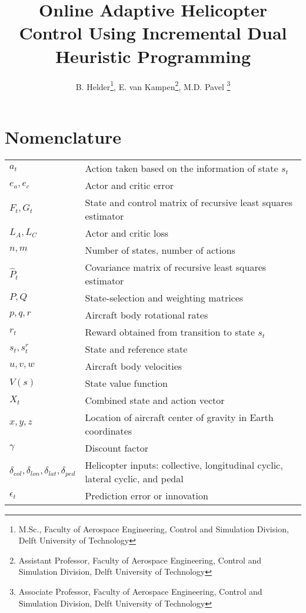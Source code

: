 \documentclass[conf]{new-aiaa} %
\title{Online Adaptive Helicopter Control Using Incremental Dual Heuristic Programming}
\author{B. Helder\footnote{M.Sc., Faculty of Aerospace Engineering, Control and Simulation Division,  Delft University of Technology},
        E. van Kampen\footnote{Assistant Professor, Faculty of Aerospace Engineering, Control and Simulation Division, Delft University of Technology}, 
        M.D. Pavel \footnote{Associate Professor, Faculty of Aerospace Engineering, Control and Simulation Division, Delft University of Technology}}
\affil{Delft University of Technology, P.O Box 5058, 2600GB Delft, The Netherlands}
\begin{document}
\maketitle

\begin{abstract}

\end{abstract}

\section*{Nomenclature}


{\renewcommand\arraystretch{1.0}
\noindent\begin{longtable*}{@{}l @{\quad=\quad} l@{}}
$a_t$               & Action taken based on the information of state $s_t$ \\
$e_a, e_c$          & Actor and critic error \\
$F_t, G_t$          & State and control matrix of recursive least squares estimator \\
$L_A, L_C$          & Actor and critic loss \\ 
$n, m$              & Number of states, number of actions\\
$\hat{P}_t$         & Covariance matrix of recursive least squares estimator \\
$P, Q$              & State-selection and weighting matrices \\
$p, q, r$           & Aircraft body rotational rates \\
$r_{t}$             & Reward obtained from transition to state $s_t$ \\
$s_t, s^r_t$        & State and reference state \\
$u, v, w$           & Aircraft body velocities \\
$V(s) $             & State value function \\
$X_t$               & Combined state and action vector \\ 
$x, y, z$           & Location of aircraft center of gravity in Earth coordinates \\
$\gamma$            & Discount factor \\
$\delta_{col}, \delta_{lon}, \delta_{lat}, \delta_{ped}$ & Helicopter inputs: collective, longitudinal cyclic, lateral cyclic, and pedal \\
$\epsilon_t$        & Prediction error or innovation \\

\end{longtable*}}
\end{document}
